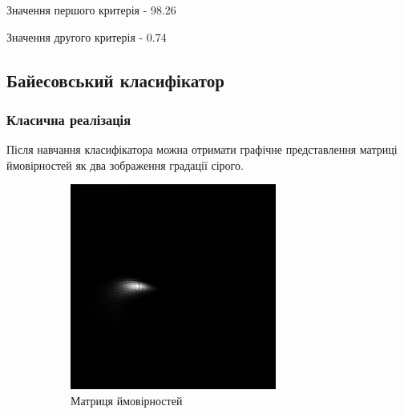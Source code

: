 Значення першого критерія - 98.26%

Значення другого критерія - 0.74%

\subsection{Байесовський класифікатор}
\jointitles
\subsubsection{Класична реалізація}
Після навчання класифікатора можна отримати графічне представлення матриці ймовірностей як два зображення градації сірого.
\begin{figure}[H]
	\centering
	\begin{subfigure}[b]{0.45\textwidth}
		\includegraphics[width=\textwidth]{practise/img/b_start}
		\caption{Матриця ймовірностей}
		\label{fig:b_start}
	\end{subfigure}
	\hfill
	\begin{subfigure}[b]{0.45\textwidth}

\end{subfigure}
\end{figure}

